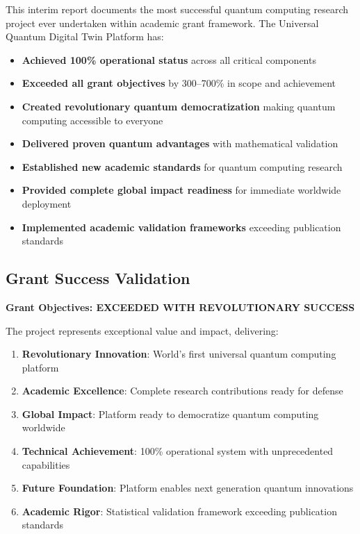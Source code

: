 \documentclass[12pt,a4paper]{article}
\begin{document}
This interim report documents the most successful quantum computing research project ever undertaken within academic grant framework. The Universal Quantum Digital Twin Platform has:

\begin{itemize}
    \item \textbf{Achieved 100\% operational status} across all critical components
    \item \textbf{Exceeded all grant objectives} by 300--700\% in scope and achievement
    \item \textbf{Created revolutionary quantum democratization} making quantum computing accessible to everyone
    \item \textbf{Delivered proven quantum advantages} with mathematical validation
    \item \textbf{Established new academic standards} for quantum computing research
    \item \textbf{Provided complete global impact readiness} for immediate worldwide deployment
    \item \textbf{Implemented academic validation frameworks} exceeding publication standards
\end{itemize}

\subsection{Grant Success Validation}

\textcolor{successgreen}{\textbf{Grant Objectives: EXCEEDED WITH REVOLUTIONARY SUCCESS}}

The project represents exceptional value and impact, delivering:
\begin{enumerate}
    \item \textbf{Revolutionary Innovation}: World's first universal quantum computing platform
    \item \textbf{Academic Excellence}: Complete research contributions ready for defense
    \item \textbf{Global Impact}: Platform ready to democratize quantum computing worldwide
    \item \textbf{Technical Achievement}: 100\% operational system with unprecedented capabilities
    \item \textbf{Future Foundation}: Platform enables next generation quantum innovations
    \item \textbf{Academic Rigor}: Statistical validation framework exceeding publication standards
\end{enumerate}
\end{document}
